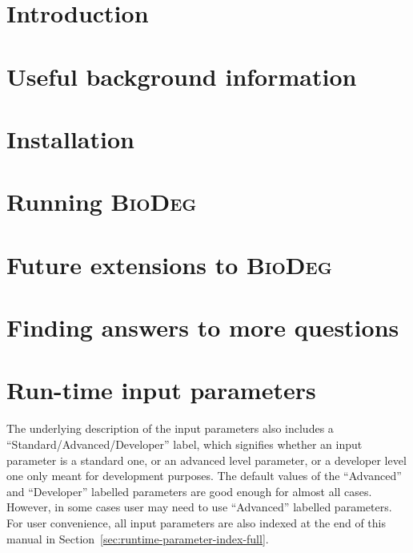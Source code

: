 \documentclass{article}
\newcommand{\biodeg}{\textsc{BioDeg}}
\begin{document}
\pagebreak

\tableofcontents

\pagebreak

\section{Introduction}
\label{sec:intro}


\section{Useful background information}
\label{sec:background}


\section{Installation}
\label{sec:installation}


\section{Running \biodeg}
\label{sec:run}


\section{Future extensions to \biodeg}
\label{sec:future}


\section{Finding answers to more questions}
\label{sec:questions-and-answers}


\appendix

\section{Run-time input parameters}
\label{sec:parameters}
The underlying description of the input parameters also includes a ``Standard/Advanced/Developer'' label, which signifies whether an input parameter is
a standard one, or an advanced level parameter, or a developer level one only meant for development purposes. The default values of the ``Advanced'' and ``Developer'' labelled parameters are good enough for almost all cases. However, in some cases user may need to use ``Advanced'' labelled parameters. For user convenience,
all input parameters are also indexed at the end of this manual in Section~\ref{sec:runtime-parameter-index-full}.



\pagebreak


\printindex[prmindexfull]
\end{document}

